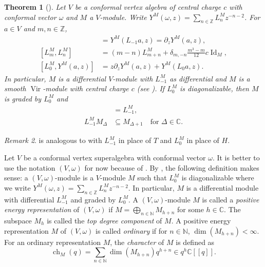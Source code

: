\documentclass[a4paper, 12pt, reqno]{amsart}
\newtheorem{theorem}{Theorem}[section]
\theoremstyle{remark}
\newtheorem{remark}[theorem]{Remark}
\numberwithin{equation}{subsection}
\DeclareMathOperator{\Vir}{Vir}
\DeclareMathOperator{\Id}{Id}
\DeclareMathOperator{\ch}{ch}
\begin{document}
\begin{theorem}[{\cite[Proposition 4.1.5 and (4.1.18)]{lepowsky_introduction_2004}}]
  \label{thr:27}
  Let $V$ be a conformal vertex algebra of central charge $c$ with conformal vector $\omega$ and $M$ a $V$-module.
  Write $Y^M(\omega, z) = \sum_{n \in \mathbb{Z}}L^M_nz^{-n - 2}$.
  For $a \in V$ and $m, n \in \mathbb{Z}$,
  \begin{align*}
    [L^M_{-1}, Y^M(a, z)] &= Y^M(L_{-1}a, z) = \partial_zY^M(a, z), \\
    [L^M_m, L^M_n] &= (m - n)L^M_{m + n} + \delta_{m, -n}\frac{m^3 - m}{12}c\Id_M, \\
    [L^M_0, Y^M(a, z)] &= z\partial_zY^M(a, z) + Y^M(L_0a, z).
  \end{align*}
  In particular, $M$ is a differential $V$-module with $L_{-1}^M $ as differential and $M$ is a smooth $\Vir$-module with central charge $c$ (see ).
  If $L^M_0$ is diagonalizable, then $M$ is graded by $L_0^M$ and
  \begin{align*}
    [L_0^M, L_{-1}^M] &= L_{-1}^M, \\
    L^M_{-1}M_{\Delta} &\subseteq M_{\Delta + 1} \quad \text{for }\Delta \in \mathbb{C}.
  \end{align*}
\end{theorem}

\begin{remark}
  \label{rmk:24}
   is analogous to  with $L_{-1}^M$ in place of $T$ and $L_0^M$ in place of $H$.
\end{remark}

Let $V$ be a conformal vertex superalgebra with conformal vector $\omega$.
It is better to use the notation $(V, \omega)$ for now because of .
By , the following definition makes sense: a $(V, \omega)$-module is a $V$-module $M$ such that $L^M_0$ is diagonalizable where we write $Y^M(\omega, z) = \sum_{n \in \mathbb{Z}}L^M_nz^{-n - 2}$.
In particular, $M$ is a differential module with differential $L^M_{-1}$ and graded by $L^M_0$.
A $(V, \omega)$-module $M$ is called a \emph{positive energy representation} of $(V, \omega)$ if $M = \bigoplus_{n \in \mathbb{N}}M_{h + n}$ for some $h \in \mathbb{C}$.
The subspace $M_h$ is called the \emph{top degree component} of $M$.
A positive energy representation $M$ of $(V, \omega)$ is called \emph{ordinary} if for $n \in \mathbb{N}$, $\dim(M_{h + n}) < \infty$.
For an ordinary representation $M$, the \emph{character} of $M$ is defined as
\begin{equation*}
  \ch_M(q) = \sum_{n \in \mathbb{N}}\dim(M_{h + n})q^{h + n} \in q^h\mathbb{C}[[q]].
\end{equation*}
\end{document}

